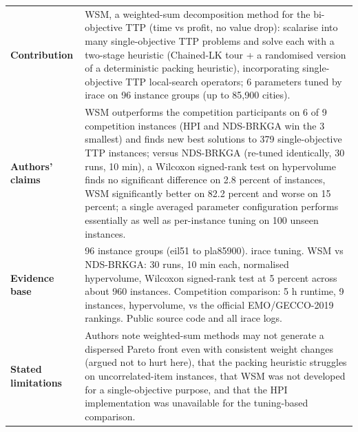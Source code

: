 \documentclass[
  a4paper,
  11pt,
  headings=small,
  numbers=noenddot,
  abstract=on,
  parskip=half,
]{scrartcl}
\begin{document}
\begin{landscape}
\begin{longtable}{@{}p{2.6cm}p{8.7cm}p{2.6cm}p{8.7cm}@{}}
\textbf{Contribution} & \multicolumn{3}{p{20.0cm}}{WSM, a weighted-sum decomposition method for the bi-objective TTP (time vs profit, no value drop): scalarise into many single-objective TTP problems and solve each with a two-stage heuristic (Chained-LK tour + a randomised version of a deterministic packing heuristic), incorporating single-objective TTP local-search operators; 6 parameters tuned by irace on 96 instance groups (up to 85,900 cities).} \\
\textbf{Authors' claims} & \multicolumn{3}{p{20.0cm}}{WSM outperforms the competition participants on 6 of 9 competition instances (HPI and NDS-BRKGA win the 3 smallest) and finds new best solutions to 379 single-objective TTP instances; versus NDS-BRKGA (re-tuned identically, 30 runs, 10 min), a Wilcoxon signed-rank test on hypervolume finds no significant difference on 2.8 percent of instances, WSM significantly better on 82.2 percent and worse on 15 percent; a single averaged parameter configuration performs essentially as well as per-instance tuning on 100 unseen instances.} \\
\textbf{Evidence base} & \multicolumn{3}{p{20.0cm}}{96 instance groups (eil51 to pla85900). irace tuning. WSM vs NDS-BRKGA: 30 runs, 10 min each, normalised hypervolume, Wilcoxon signed-rank test at 5 percent across about 960 instances. Competition comparison: 5 h runtime, 9 instances, hypervolume, vs the official EMO/GECCO-2019 rankings. Public source code and all irace logs.} \\
\textbf{Stated limitations} & \multicolumn{3}{p{20.0cm}}{Authors note weighted-sum methods may not generate a dispersed Pareto front even with consistent weight changes (argued not to hurt here), that the packing heuristic struggles on uncorrelated-item instances, that WSM was not developed for a single-objective purpose, and that the HPI implementation was unavailable for the tuning-based comparison.} \\

\end{longtable}
\end{landscape}
\end{document}
